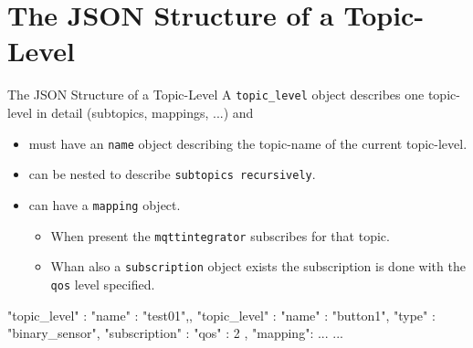 ﻿\section[nosectionpage]{The JSON Structure of a Topic-Level}

\begin{frame}[fragile]{The JSON Structure of a Topic-Level}
  A \texttt{\textcolor{fh-ooe-red}{topic\_level}} object \textcolor{fh-ooe-red}{describes one topic-level in detail} (subtopics, mappings, ...) and
  \begin{itemize}
    \item \textcolor{fh-ooe-red}{must have an \texttt{name} object} describing the \textcolor{fh-ooe-red}{topic-name} of the \textcolor{fh-ooe-red}{current topic-level}.
    \item can be nested to describe \texttt{\textcolor{fh-ooe-red}{subtopics recursively}}.
    \item can have a \texttt{\textcolor{fh-ooe-red}{mapping}} object.
    \begin{itemize}
      \item When present the \texttt{\textcolor{fh-ooe-red}{mqttintegrator}} subscribes for that topic.
      \item Whan also a \texttt{\textcolor{fh-ooe-red}{subscription}} object exists the subscription is done with the \texttt{\textcolor{fh-ooe-red}{qos}} level specified.
    \end{itemize}
  \end{itemize}

  \begin{jsoncode}[gobble=4]
    "topic_level" : {
        "name" : "test01",,
        "topic_level" : {
            "name" : "button1",
            "type" : "binary_sensor",
            "subscription" : {
                "qos" : 2
            },
            "mapping": {
                ...
            }
            ...
        }
    }
  \end{jsoncode}
\end{frame}

